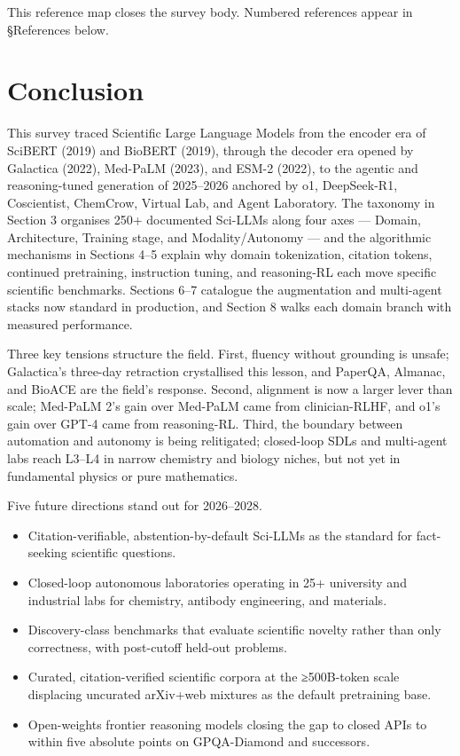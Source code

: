 \documentclass{article}
\begin{document}
This reference map closes the survey body. Numbered references appear in §References below.

\section{Conclusion}\label{conclusion}

This survey traced Scientific Large Language Models from the encoder era of SciBERT (2019) and BioBERT (2019), through the decoder era opened by Galactica (2022), Med-PaLM (2023), and ESM-2 (2022), to the agentic and reasoning-tuned generation of 2025--2026 anchored by o1, DeepSeek-R1, Coscientist, ChemCrow, Virtual Lab, and Agent Laboratory. The taxonomy in Section 3 organises 250+ documented Sci-LLMs along four axes --- Domain, Architecture, Training stage, and Modality/Autonomy --- and the algorithmic mechanisms in Sections 4--5 explain why domain tokenization, citation tokens, continued pretraining, instruction tuning, and reasoning-RL each move specific scientific benchmarks. Sections 6--7 catalogue the augmentation and multi-agent stacks now standard in production, and Section 8 walks each domain branch with measured performance.

Three key tensions structure the field. First, fluency without grounding is unsafe; Galactica's three-day retraction crystallised this lesson, and PaperQA, Almanac, and BioACE are the field's response. Second, alignment is now a larger lever than scale; Med-PaLM 2's gain over Med-PaLM came from clinician-RLHF, and o1's gain over GPT-4 came from reasoning-RL. Third, the boundary between automation and autonomy is being relitigated; closed-loop SDLs and multi-agent labs reach L3--L4 in narrow chemistry and biology niches, but not yet in fundamental physics or pure mathematics.

Five future directions stand out for 2026--2028.

\begin{itemize}

\item
  Citation-verifiable, abstention-by-default Sci-LLMs as the standard for fact-seeking scientific questions.
\item
  Closed-loop autonomous laboratories operating in 25+ university and industrial labs for chemistry, antibody engineering, and materials.
\item
  Discovery-class benchmarks that evaluate scientific novelty rather than only correctness, with post-cutoff held-out problems.
\item
  Curated, citation-verified scientific corpora at the ≥500B-token scale displacing uncurated arXiv+web mixtures as the default pretraining base.
\item
  Open-weights frontier reasoning models closing the gap to closed APIs to within five absolute points on GPQA-Diamond and successors.
\end{itemize}
\end{document}
